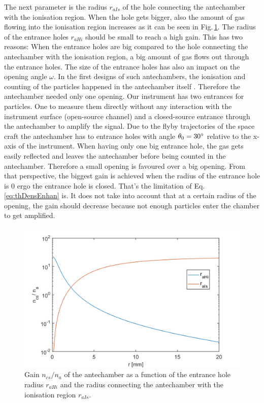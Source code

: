 		The next parameter is the radius $r_{aIs}$ of the hole connecting the antechamber with the ionisation region. When the hole gets bigger, also the amount of gas flowing into the ionisation region increases as it can be seen in Fig.\,\ref{th:densEnhraHiraIs}. The radius of the entrance holes $r_{aHi}$ should be small to reach a high gain. This has two reasons: When the entrance holes are big compared to the hole connecting the antechamber with the ionisation region, a big amount of gas flows out through the entrance holes. The size of the entrance holes has also an impact on the opening angle $\omega$. In the first designs of such antechambers, the ionisation and counting of the particles happened in the antechamber itself \cite{Hedin_1964}. Therefore the antechamber needed only one opening. Our instrument has two entrances for particles. One to measure them directly without any interaction with the instrument surface (open-source channel) and a closed-source entrance through the antechamber to amplify the signal. Due to the flyby trajectories of the space craft the antechamber has to entrance holes with angle $\theta_0 = 30^\circ$ relative to the x-axis of the instrument.
		When having only one big entrance hole, the gas gets easily reflected and leaves the antechamber before being counted in the antechamber. Therefore a small opening is favoured over a big opening. From that perspective, the biggest gain is achieved when the radius of the entrance hole is 0 ergo the entrance hole is closed. That's the limitation of Eq.\,\eqref{eq:thDensEnhan} is. It does not take into account that at a certain radius of the opening, the gain should decrease because not enough particles enter the chamber to get amplified.\\
		\begin{figure}[h!] %
			\centering
			\includegraphics[width= .7\textwidth]{Bilder/raHi_raIs.png}
			\caption{Gain $n_{cs}/n_a$ of the antechamber as a function of the entrance hole radius $r_{aHi}$ and the radius connecting the antechamber with the ionisation region $r_{aIs}$.}
			\label{th:densEnhraHiraIs}
		\end{figure}
